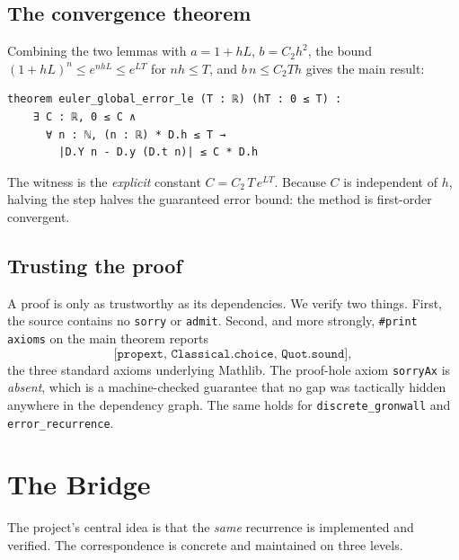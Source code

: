 \documentclass[sigplan,nonacm,screen]{acmart}
\begin{document}
\subsection{The convergence theorem}
Combining the two lemmas with $a = 1 + hL$, $b = C_2 h^2$, the bound
$(1+hL)^n \le e^{nhL} \le e^{LT}$ for $nh \le T$, and $b\,n \le C_2 T h$ gives the
main result:

\begin{lstlisting}[language=lean]
theorem euler_global_error_le (T : ℝ) (hT : 0 ≤ T) :
    ∃ C : ℝ, 0 ≤ C ∧
      ∀ n : ℕ, (n : ℝ) * D.h ≤ T →
        |D.Y n - D.y (D.t n)| ≤ C * D.h
\end{lstlisting}

The witness is the \emph{explicit} constant $C = C_2\,T\,e^{LT}$. Because $C$ is
independent of $h$, halving the step halves the guaranteed error bound: the method
is first-order convergent.

\subsection{Trusting the proof}
A proof is only as trustworthy as its dependencies. We verify two things. First,
the source contains no \texttt{sorry} or \texttt{admit}. Second, and more
strongly, \texttt{\#print axioms} on the main theorem reports
\[
  \texttt{[propext, Classical.choice, Quot.sound]},
\]
the three standard axioms underlying Mathlib. The proof-hole axiom
\texttt{sorryAx} is \emph{absent}, which is a machine-checked guarantee that no
gap was tactically hidden anywhere in the dependency graph. The same holds for
\texttt{discrete\_gronwall} and \texttt{error\_recurrence}.

\section{The Bridge}
\label{sec:bridge}

The project's central idea is that the \emph{same} recurrence is implemented and
verified. The correspondence is concrete and maintained on three levels.

\begin{table}[t]
\caption{The correspondence between executed code and proof.}
\label{tab:bridge}
\small
{}
\end{table}
\end{document}
